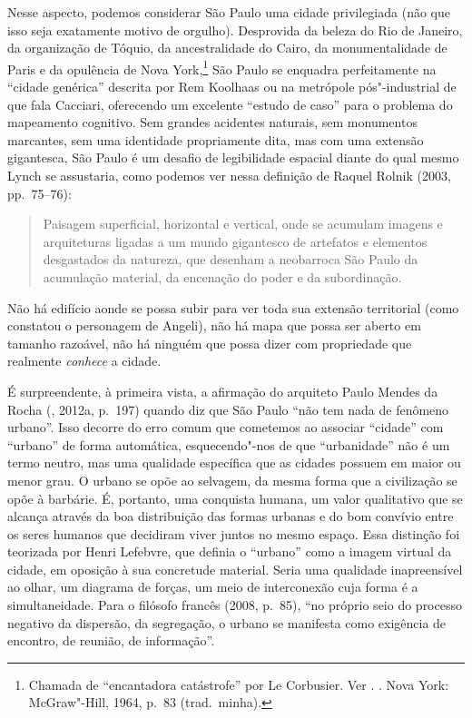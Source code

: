 Nesse aspecto, podemos considerar São Paulo uma cidade privilegiada (não
que isso seja exatamente motivo de orgulho). Desprovida da beleza do Rio
de Janeiro, da organização de Tóquio, da ancestralidade do Cairo, da
monumentalidade de Paris e da opulência de Nova York,\footnote{Chamada de
  ``encantadora catástrofe'' por Le Corbusier. Ver . {}. Nova York:
  McGraw"-Hill, 1964, p.~83 (trad.~minha).} São Paulo se enquadra
perfeitamente na ``cidade genérica'' descrita por Rem Koolhaas ou na
metrópole pós"-industrial de que fala Cacciari, oferecendo um excelente
``estudo de caso'' para o problema do mapeamento cognitivo. Sem grandes
acidentes naturais, sem monumentos marcantes, sem uma identidade
propriamente dita, mas com uma extensão gigantesca, São Paulo é um
desafio de legibilidade espacial diante do qual mesmo Lynch se
assustaria, como podemos ver nessa definição de Raquel Rolnik (2003, pp.~75--76):

\begin{quote}
Paisagem superficial, horizontal e vertical, onde se acumulam imagens e
arquiteturas ligadas a um mundo gigantesco de artefatos e elementos
desgastados da natureza, que desenham a neobarroca São Paulo da
acumulação material, da encenação do poder e da subordinação.
\end{quote}

Não há edifício aonde se possa subir para ver toda sua extensão
territorial (como constatou o personagem de Angeli), não há mapa que
possa ser aberto em tamanho razoável, não há ninguém que possa dizer com
propriedade que realmente \emph{conhece} a cidade.

É surpreendente, à primeira vista, a afirmação do arquiteto Paulo Mendes
da Rocha (, 2012a, p.~197) quando diz que São Paulo ``não tem nada
de fenômeno urbano''. Isso decorre do erro comum que cometemos ao
associar ``cidade'' com ``urbano'' de forma automática, esquecendo"-nos
de que ``urbanidade'' não é um termo neutro, mas uma qualidade
específica que as cidades possuem em maior ou menor grau. O urbano se
opõe ao selvagem, da mesma forma que a civilização se opõe à barbárie.
É, portanto, uma conquista humana, um valor qualitativo que se alcança
através da boa distribuição das formas urbanas e do bom convívio entre
os seres humanos que decidiram viver juntos no mesmo espaço. Essa
distinção foi teorizada por Henri Lefebvre, que definia o ``urbano''
como a imagem virtual da cidade, em oposição à sua concretude material.
Seria uma qualidade inapreensível ao olhar, um diagrama de forças, um
meio de interconexão cuja forma é a simultaneidade. Para o filósofo
francês (2008, p.~85), ``no próprio seio do processo negativo da
dispersão, da segregação, o urbano se manifesta como exigência de
encontro, de reunião, de informação''.

